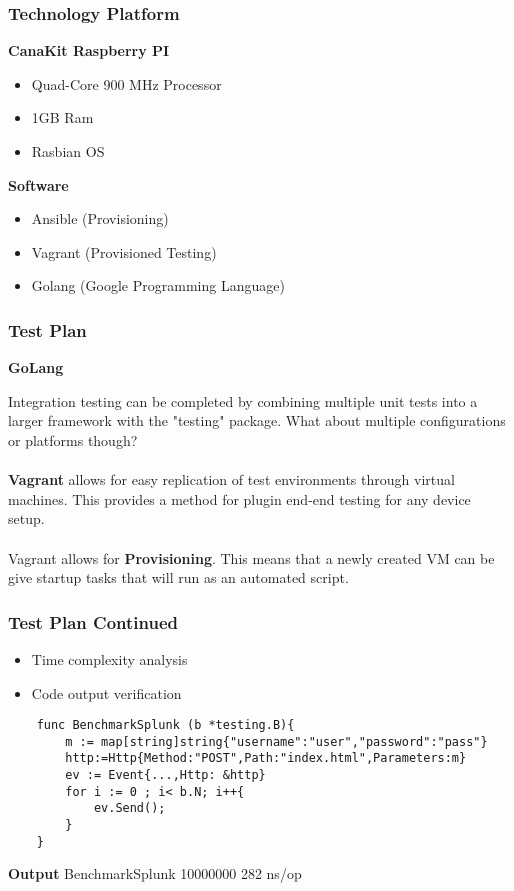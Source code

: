 \begin{frame}
\frametitle{Technology Platform}
\textbf{CanaKit Raspberry PI}
\begin{itemize}
\item Quad-Core 900 MHz Processor
\item 1GB Ram
\item Rasbian OS
\end{itemize}

\textbf{Software}
\begin{itemize}
\item Ansible (Provisioning)
\item Vagrant (Provisioned Testing)
\item Golang (Google Programming Language)
\end{itemize}


\end{frame}

\begin{frame}

\frametitle{Test Plan}
\textbf{GoLang}

Integration testing can be completed by combining multiple unit tests into a larger framework with the "testing" package. 
What about multiple configurations or platforms though?\\~\\

\textbf {Vagrant} allows for easy replication of test environments through virtual machines. This provides a method for plugin end-end testing for any device setup. \\~\\

Vagrant allows for \textbf{Provisioning}. This means that a newly created VM can be give startup tasks that will run as an automated script.

\end{frame}

\begin{frame}[fragile]
\frametitle{Test Plan Continued}
\begin{itemize} %
	\item Time complexity analysis
	\item Code output verification
	\end{itemize}

\begin{example} %
\begin{verbatim}
	func BenchmarkSplunk (b *testing.B){
		m := map[string]string{"username":"user","password":"pass"}
		http:=Http{Method:"POST",Path:"index.html",Parameters:m}
		ev := Event{...,Http: &http}
		for i := 0 ; i< b.N; i++{
			ev.Send();
		}
	}
\end{verbatim}
\end{example}
	\textbf{Output}
	BenchmarkSplunk    10000000    282 ns/op


\end{frame}

